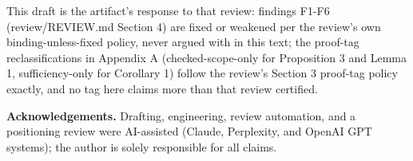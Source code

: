 \documentclass[11pt,a4paper]{article}
\theoremstyle{definition}
\begin{document}
This draft is the artifact's response to that review: findings F1-F6 (\mbox{review/REVIEW.md} Section 4) are fixed or weakened per the review's own binding-unless-fixed policy, never argued with in this text; the proof-tag reclassifications in Appendix A (checked-scope-only for Proposition 3 and Lemma 1, sufficiency-only for Corollary 1) follow the review's Section 3 proof-tag policy exactly, and no tag here claims more than that review certified.

\textbf{Acknowledgements.} Drafting, engineering, review automation, and a positioning review were AI-assisted (Claude, Perplexity, and OpenAI GPT systems); the author is solely responsible for all claims.

\nocite{*}


\end{document}
